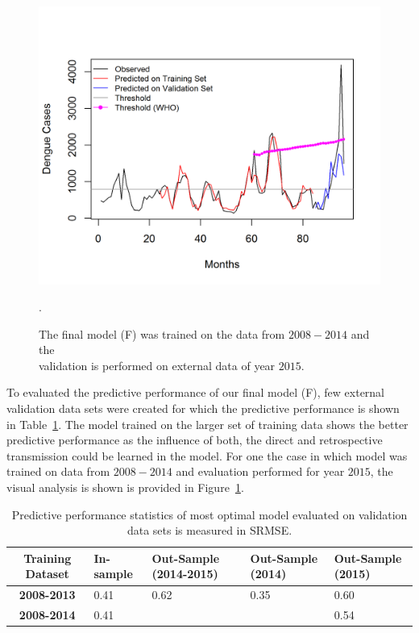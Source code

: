 \documentclass{bmcart}
\begin{document}
\begin{figure}[h!]
	\begin{center}
		\includegraphics[width= 1.0\textwidth]{Final-Prediction}
		\caption{The final model (F) was trained on the data from $2008-2014$ and the \\ validation is performed on external data of year $2015$.}.
		\label{fig:validate}
	\end{center}
\end{figure}




To evaluated the predictive performance of our final model (F), few external validation data sets were created for which the predictive performance is shown in Table~\ref{tab:resultsOfValidation}. The model trained on the larger set of training data shows the better predictive performance as the influence of both, the direct and retrospective transmission could be learned in the model. For one the case in which model was trained on data from $2008-2014$ and evaluation performed for year $2015$, the visual analysis is shown is provided in Figure~\ref{fig:validate}. 


\begin{table}[H]
	\centering
	\begin{tabular}{|cp{1.5cm}p{1.5cm}p{1.5cm}p{1.5cm}|}
		\hline
		\textbf{Training Dataset} & \textbf{In-sample} &  \textbf{Out-Sample} (2014-2015) & \textbf{Out-Sample} (2014) & \textbf{Out-Sample} (2015) \\ 
		\hline
		\textbf{2008-2013} & 0.41 &  0.62 &  0.35 & 0.60 \\ 
		\textbf{2008-2014} & 0.41 &       &       & 0.54 \\ 
		\hline
	\end{tabular}
	\caption{Predictive performance statistics of most optimal model evaluated on validation data sets is measured in SRMSE.}
	\label{tab:resultsOfValidation}
\end{table}
\end{document}
